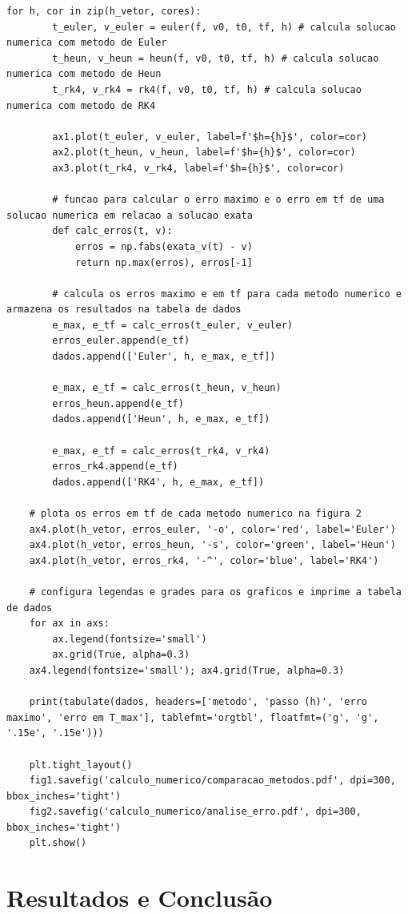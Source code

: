 \documentclass[11pt]{article}
\begin{document}
\begin{lstlisting}[style=python-custom, caption={Resolução do PVI do circuito RC usando os métodos de Euler, Heun e RK4.}, label={lst:resolucao_edo}]
    for h, cor in zip(h_vetor, cores):
        t_euler, v_euler = euler(f, v0, t0, tf, h) # calcula solucao numerica com metodo de Euler
        t_heun, v_heun = heun(f, v0, t0, tf, h) # calcula solucao numerica com metodo de Heun
        t_rk4, v_rk4 = rk4(f, v0, t0, tf, h) # calcula solucao numerica com metodo de RK4
        
        ax1.plot(t_euler, v_euler, label=f'$h={h}$', color=cor)
        ax2.plot(t_heun, v_heun, label=f'$h={h}$', color=cor)
        ax3.plot(t_rk4, v_rk4, label=f'$h={h}$', color=cor)
        
        # funcao para calcular o erro maximo e o erro em tf de uma solucao numerica em relacao a solucao exata
        def calc_erros(t, v):
            erros = np.fabs(exata_v(t) - v)
            return np.max(erros), erros[-1]

        # calcula os erros maximo e em tf para cada metodo numerico e armazena os resultados na tabela de dados
        e_max, e_tf = calc_erros(t_euler, v_euler)
        erros_euler.append(e_tf)
        dados.append(['Euler', h, e_max, e_tf])
        
        e_max, e_tf = calc_erros(t_heun, v_heun)
        erros_heun.append(e_tf)
        dados.append(['Heun', h, e_max, e_tf])

        e_max, e_tf = calc_erros(t_rk4, v_rk4)
        erros_rk4.append(e_tf)
        dados.append(['RK4', h, e_max, e_tf])

    # plota os erros em tf de cada metodo numerico na figura 2
    ax4.plot(h_vetor, erros_euler, '-o', color='red', label='Euler')
    ax4.plot(h_vetor, erros_heun, '-s', color='green', label='Heun')
    ax4.plot(h_vetor, erros_rk4, '-^', color='blue', label='RK4')

    # configura legendas e grades para os graficos e imprime a tabela de dados
    for ax in axs:
        ax.legend(fontsize='small')
        ax.grid(True, alpha=0.3)
    ax4.legend(fontsize='small'); ax4.grid(True, alpha=0.3)

    print(tabulate(dados, headers=['metodo', 'passo (h)', 'erro maximo', 'erro em T_max'], tablefmt='orgtbl', floatfmt=('g', 'g', '.15e', '.15e')))

    plt.tight_layout()
    fig1.savefig('calculo_numerico/comparacao_metodos.pdf', dpi=300, bbox_inches='tight')
    fig2.savefig('calculo_numerico/analise_erro.pdf', dpi=300, bbox_inches='tight')
    plt.show()
\end{lstlisting}

\section{Resultados e Conclusão}
\end{document}
